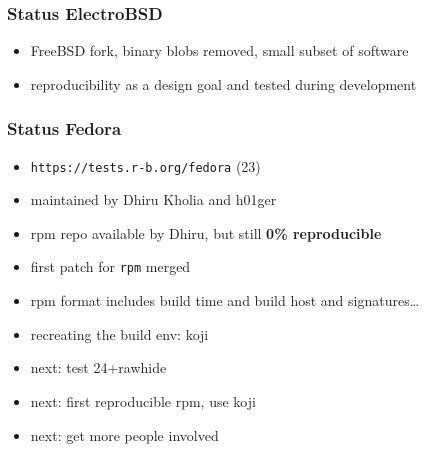 \documentclass[14pt]{beamer}
\begin{document}
\begin{frame}
 \frametitle{Status ElectroBSD}
 \begin{itemize}
  \item FreeBSD fork, binary blobs removed, small subset of software
  \item reproducibility as a design goal and tested during development
 \end{itemize}
\end{frame}


\begin{frame}
 \frametitle{Status Fedora}
 \begin{itemize}
  \item \texttt{https://tests.r-b.org/fedora} (23)
  \item maintained by Dhiru Kholia and h01ger
  \item rpm repo available by Dhiru, but still \textbf{0\% reproducible}
  \item first patch for \texttt{rpm} merged
  \item rpm format includes build time and build host and signatures…
  \item recreating the build env: koji
  \item next: test 24+rawhide
  \item next: first reproducible rpm, use koji
  \item next: get more people involved
 \end{itemize}
\end{frame}
\end{document}
